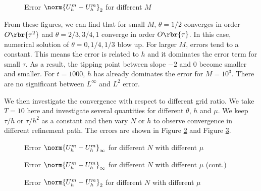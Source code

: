 \documentclass[english, nochinese]{pnote}
\begin{document}
\begin{figure}[htbp]
\centering
\scalebox{0.75}{}
\caption{Error $ \norm{ U_h^m - U_h^m }_2 $ for different $M$}
\label{Fig:Conv2}
\end{figure}

From these figures, we can find that for small $M$, $ \theta = 1 / 2 $ converges in order $ O \rbr{\tau^2} $ and $ \theta = 2 / 3, 3 / 4, 1 $ converge in order $ O \rbr{\tau} $. In this case, numerical solution of $ \theta = 0, 1 / 4, 1 / 3 $ blow up. For larger $M$, errors tend to a constant. This means the error is related to $h$ and it dominates the error term for small $\tau$.
As a result, the tipping point between slope $-2$ and $0$ become smaller and smaller. For $ t = 1000 $, $h$ has already dominates the error for $ M = 10^3 $. There are no significant between $L^{\infty}$ and $L^2$ error.

We then investigate the convergence with respect to different grid ratio. We take $ T = 10 $ here and investigate several quantities for different $\theta$, $h$ and $\mu$. We keep $ \tau / h $ or $ \tau / h^2 $ as a constant and then vary $N$ or $h$ to observe convergence in different refinement path. The errors are shown in Figure \ref{Fig:OrderI} and Figure \ref{Fig:Order2}.

\begin{figure}[htbp]
\centering
\scalebox{0.75}{}
\caption{Error $ \norm{ U_h^m - U_h^m }_{\infty} $ for different $N$ with different $\mu$}
\label{Fig:OrderI}
\end{figure}

\begin{figure}[htbp]
\ContinuedFloat
\centering
\scalebox{0.75}{}
\caption{Error $ \norm{ U_h^m - U_h^m }_{\infty} $ for different $N$ with different $\mu$ (cont.)}
\end{figure}

\begin{figure}[htbp]
\centering
\scalebox{0.75}{}
\caption{Error $ \norm{ U_h^m - U_h^m }_2 $ for different $N$ with different $\mu$}
\label{Fig:Order2}
\end{figure}
\end{document}

